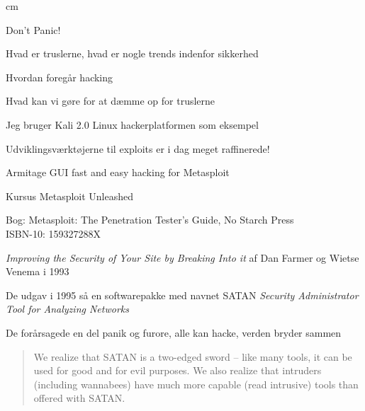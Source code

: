 \documentclass[20pt,landscape,a4paper,footrule]{foils}
\begin{document}




 cm

\centerline{\color{titlecolor}\LARGE Don't Panic!}

\begin{list1}
\item Hvad er truslerne, hvad er nogle trends indenfor sikkerhed
\item Hvordan foregår hacking
\item Hvad kan vi gøre for at dæmme op for truslerne
\end{list1}

\vskip 1cm
\centerline{Jeg bruger Kali 2.0 Linux hackerplatformen som eksempel}






\begin{list1}
\item Udviklingsværktøjerne til exploits er i dag meget raffinerede!
\item {}
\item Armitage GUI fast and easy hacking for Metasploit\\
\item Kursus Metasploit Unleashed\\
\item Bog: Metasploit: The Penetration Tester's Guide, No Starch Press\\
ISBN-10: 159327288X
\end{list1}



\begin{list1}
\item \emph{Improving the Security of Your Site by Breaking Into it} af
Dan Farmer og Wietse Venema i 1993
\item De udgav i 1995 så en softwarepakke med navnet SATAN
\emph{Security Administrator Tool for Analyzing Networks}
\item De forårsagede en del panik og furore, alle kan hacke, verden bryder sammen

\vskip 1cm
\begin{quote}
We realize that SATAN is a two-edged sword -- like
many tools, it can be used for good and for evil
purposes. We also realize that intruders (including
wannabees) have much more capable (read intrusive)
tools than offered with SATAN.
\end{quote}
\end{list1}
\end{document}
